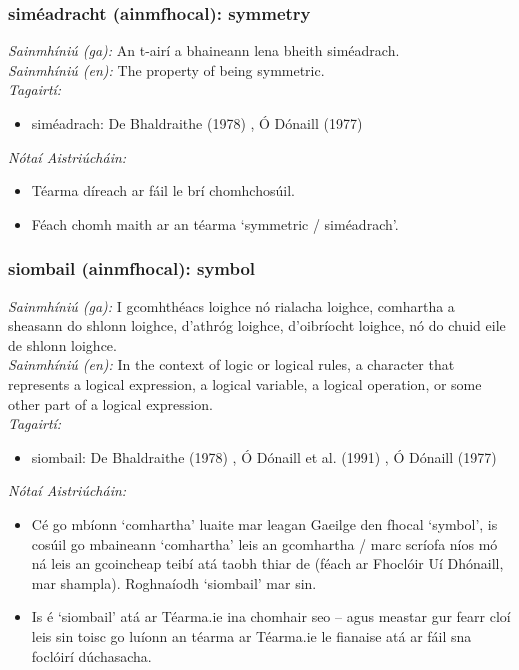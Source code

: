 \subsubsection*{siméadracht (ainmfhocal): symmetry}
 \noindent \textit{Sainmhíniú (ga):} An t-airí a bhaineann lena bheith siméadrach.
\\
 \noindent \textit{Sainmhíniú (en):} The property of being symmetric.
\\
 \noindent \textit{Tagairtí:}
\begin{itemize}
	\item siméadrach: De Bhaldraithe (1978) \cite{de-bhaldraithe}, Ó Dónaill (1977) \cite{odonaill}
\end{itemize}

 \noindent \textit{Nótaí Aistriúcháin:}
\begin{itemize}
	\item Téarma díreach ar fáil le brí chomhchosúil.
	\item Féach chomh maith ar an téarma `symmetric / siméadrach'.
\end{itemize}


\subsubsection*{siombail (ainmfhocal): symbol}
 \noindent \textit{Sainmhíniú (ga):} I gcomhthéacs loighce nó rialacha loighce, comhartha a sheasann do shlonn loighce, d'athróg loighce, d'oibríocht loighce, nó do chuid eile de shlonn loighce.
\\
 \noindent \textit{Sainmhíniú (en):} In the context of logic or logical rules, a character that represents a logical expression, a logical variable, a logical operation, or some other part of a logical expression.
\\
 \noindent \textit{Tagairtí:}
\begin{itemize}
	\item siombail: De Bhaldraithe (1978) \cite{de-bhaldraithe}, Ó Dónaill et al. (1991) \cite{focloir-beag}, Ó Dónaill (1977) \cite{odonaill}
\end{itemize}

 \noindent \textit{Nótaí Aistriúcháin:}
\begin{itemize}
	\item Cé go mbíonn `comhartha' luaite mar leagan Gaeilge den fhocal `symbol', is cosúil go mbaineann `comhartha' leis an gcomhartha / marc scríofa níos mó ná leis an gcoincheap teibí atá taobh thiar de (féach ar Fhoclóir Uí Dhónaill, mar shampla). Roghnaíodh `siombail' mar sin.
	\item Is é `siombail' atá ar Téarma.ie ina chomhair seo -- agus meastar gur fearr cloí leis sin toisc go luíonn an téarma ar Téarma.ie le fianaise atá ar fáil sna foclóirí dúchasacha.
\end{itemize}


